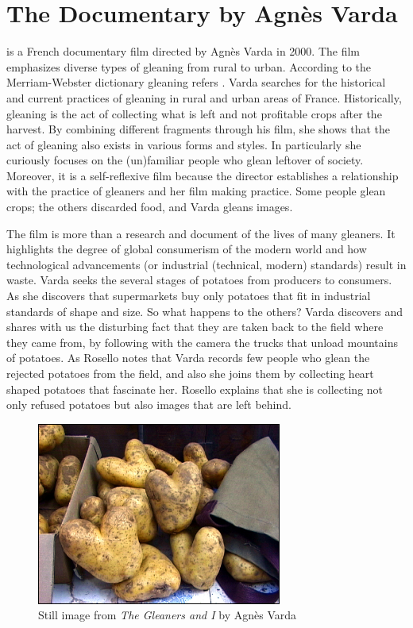 \section{The Documentary  by Agnès Varda}
 is a French documentary film directed by Agnès Varda in 2000. The film emphasizes diverse types of gleaning from rural to urban. According to the Merriam-Webster dictionary gleaning refers . Varda searches for the historical and current practices of gleaning in rural and urban areas of France. Historically, gleaning is the act of collecting what is left and not profitable crops after the harvest. By combining different fragments through his film, she shows that the act of gleaning also exists in various forms and styles. In particularly she curiously focuses on the (un)familiar people who glean leftover of society. Moreover, it is a self-reflexive film because the director establishes a relationship with the practice of gleaners and her film making practice. Some people glean crops; the others discarded food, and Varda gleans images.

The film is more than a research and document of the lives of many gleaners. It highlights the degree of global consumerism of the modern world and how technological advancements (or industrial (technical, modern) standards) result in waste. Varda seeks the several stages of potatoes from producers to consumers. As she discovers that supermarkets buy only potatoes that fit in industrial standards of shape and size. So what happens to the others? Varda discovers and shares with us the disturbing fact that they are taken back to the field where they came from, by following with the camera the trucks that unload mountains of potatoes. As Rosello notes that  Varda records few people who glean the rejected potatoes from the field, and also she joins them by collecting heart shaped potatoes that fascinate her. Rosello explains that she is collecting not only refused potatoes but also images that are left behind.

\begin{figure}[h!]
  \centering
  \includegraphics[height=6cm]{graphics/AgnesVarda_Potatoes.jpg}
  \caption{Still image from \textit{The Gleaners and I} by Agnès Varda}
  \label{fig:AgnesVarda_Potatoes}
\end{figure}

